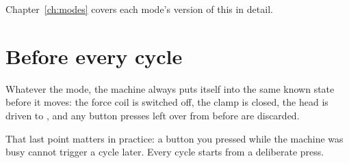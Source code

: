Chapter~\ref{ch:modes} covers each mode's version of this in detail.

\section{Before every cycle}

Whatever the mode, the machine always puts itself into the same known state
before it moves: the force coil is switched off, the clamp is closed, the head
is driven to , and any button presses left over from
before are discarded.

\begin{wbnote}
That last point matters in practice: a button you pressed while the machine was
busy cannot trigger a cycle later. Every cycle starts from a deliberate press.
\end{wbnote}
